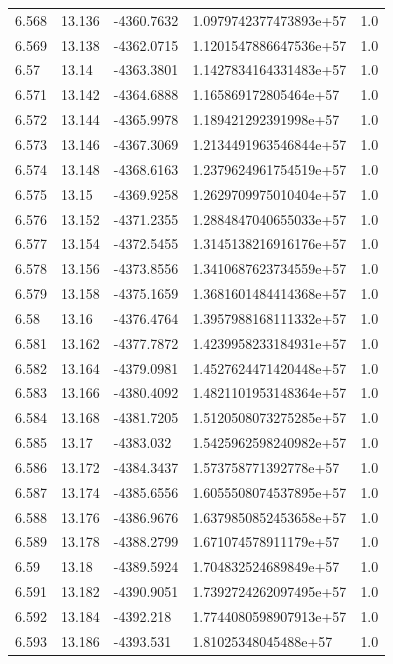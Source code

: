 \begin{tabular}{lllll}
6.568 & 13.136 & -4360.7632 & 1.0979742377473893e+57 & 1.0 \\
6.569 & 13.138 & -4362.0715 & 1.1201547886647536e+57 & 1.0 \\
6.57 & 13.14 & -4363.3801 & 1.1427834164331483e+57 & 1.0 \\
6.571 & 13.142 & -4364.6888 & 1.165869172805464e+57 & 1.0 \\
6.572 & 13.144 & -4365.9978 & 1.189421292391998e+57 & 1.0 \\
6.573 & 13.146 & -4367.3069 & 1.2134491963546844e+57 & 1.0 \\
6.574 & 13.148 & -4368.6163 & 1.2379624961754519e+57 & 1.0 \\
6.575 & 13.15 & -4369.9258 & 1.2629709975010404e+57 & 1.0 \\
6.576 & 13.152 & -4371.2355 & 1.2884847040655033e+57 & 1.0 \\
6.577 & 13.154 & -4372.5455 & 1.3145138216916176e+57 & 1.0 \\
6.578 & 13.156 & -4373.8556 & 1.3410687623734559e+57 & 1.0 \\
6.579 & 13.158 & -4375.1659 & 1.3681601484414368e+57 & 1.0 \\
6.58 & 13.16 & -4376.4764 & 1.3957988168111332e+57 & 1.0 \\
6.581 & 13.162 & -4377.7872 & 1.4239958233184931e+57 & 1.0 \\
6.582 & 13.164 & -4379.0981 & 1.4527624471420448e+57 & 1.0 \\
6.583 & 13.166 & -4380.4092 & 1.4821101953148364e+57 & 1.0 \\
6.584 & 13.168 & -4381.7205 & 1.5120508073275285e+57 & 1.0 \\
6.585 & 13.17 & -4383.032 & 1.5425962598240982e+57 & 1.0 \\
6.586 & 13.172 & -4384.3437 & 1.573758771392778e+57 & 1.0 \\
6.587 & 13.174 & -4385.6556 & 1.6055508074537895e+57 & 1.0 \\
6.588 & 13.176 & -4386.9676 & 1.6379850852453658e+57 & 1.0 \\
6.589 & 13.178 & -4388.2799 & 1.671074578911179e+57 & 1.0 \\
6.59 & 13.18 & -4389.5924 & 1.704832524689849e+57 & 1.0 \\
6.591 & 13.182 & -4390.9051 & 1.7392724262097495e+57 & 1.0 \\
6.592 & 13.184 & -4392.218 & 1.7744080598907913e+57 & 1.0 \\
6.593 & 13.186 & -4393.531 & 1.81025348045488e+57 & 1.0 \\

\end{tabular}
